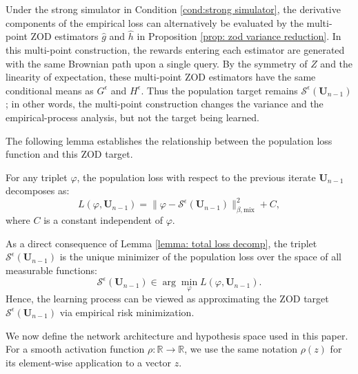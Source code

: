 \documentclass[twoside,11pt]{article}
\newcommand{\1}{\mathbf{1}}
\numberwithin{equation}{section}
\begin{document}
Under the strong simulator in Condition \ref{cond:strong simulator}, the derivative components of the empirical loss can alternatively be evaluated by the multi-point ZOD estimators $\hat g$ and $\hat h$ in Proposition \ref{prop: zod variance reduction}. In this multi-point construction, the rewards entering each estimator are generated with the same Brownian path upon a single query. By the symmetry of $Z$ and the linearity of expectation, these multi-point ZOD estimators have the same conditional means as $G^\epsilon$ and $H^\epsilon$. Thus the population target remains $\mathcal S^\epsilon(\mathbf U_{n-1})$; in other words, the multi-point construction changes the variance and the empirical-process analysis, but not the target being learned.


The following lemma establishes the relationship between the population loss function and this ZOD target.

\begin{lemma}
\label{lemma: total loss decomp}
For any triplet $\varphi$, the population loss with respect to the previous iterate $\mathbf{U}_{n-1}$ decomposes as:
\begin{equation}
    L(\varphi, \mathbf{U}_{n-1}) = \|\varphi - \mathcal{S}^\epsilon(\mathbf{U}_{n-1})\|_{\beta, \text{mix}}^2 + C,
\end{equation}
where $ C$ is a constant independent of $\varphi$.
\end{lemma}

As a direct consequence of Lemma \ref{lemma: total loss decomp}, the triplet $\mathcal{S}^\epsilon(\mathbf{U}_{n-1})$ is the unique minimizer of the population loss over the space of all measurable functions:
\begin{equation}
    \mathcal{S}^\epsilon(\mathbf{U}_{n-1}) \in \arg\min_{\varphi} L(\varphi, \mathbf{U}_{n-1}).
\end{equation}
Hence, the learning process can be viewed as approximating the ZOD target $\mathcal{S}^\epsilon(\mathbf{U}_{n-1})$ via empirical risk minimization.

We now define the network architecture and hypothesis space used in this paper. For a smooth activation function $\rho:\mathbb R\to\mathbb R$, we use the same notation $\rho(z)$ for its element-wise application to a vector $z$.
\end{document}
